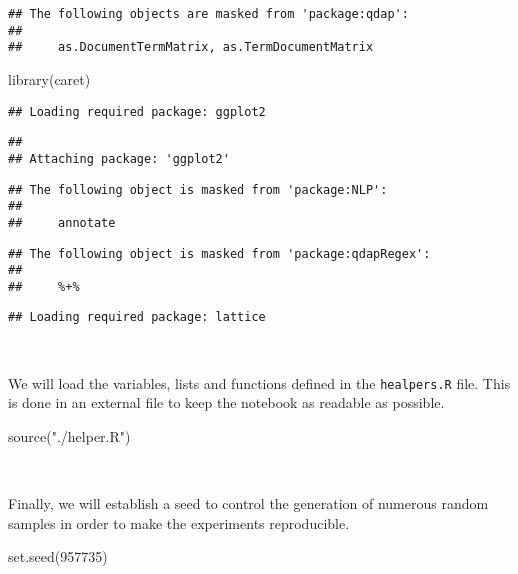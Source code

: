 \documentclass[
]{article}
\newenvironment{Shaded}{\begin{snugshade}}{\end{snugshade}}
\newcommand{\DecValTok}[1]{\textcolor[rgb]{0.00,0.00,0.81}{#1}}
\newcommand{\FunctionTok}[1]{\textcolor[rgb]{0.00,0.00,0.00}{#1}}
\newcommand{\NormalTok}[1]{#1}
\newcommand{\StringTok}[1]{\textcolor[rgb]{0.31,0.60,0.02}{#1}}
\begin{document}
\begin{verbatim}
## The following objects are masked from 'package:qdap':
## 
##     as.DocumentTermMatrix, as.TermDocumentMatrix
\end{verbatim}

\begin{Shaded}
\begin{Highlighting}[]
\FunctionTok{library}\NormalTok{(caret)}
\end{Highlighting}
\end{Shaded}

\begin{verbatim}
## Loading required package: ggplot2
\end{verbatim}

\begin{verbatim}
## 
## Attaching package: 'ggplot2'
\end{verbatim}

\begin{verbatim}
## The following object is masked from 'package:NLP':
## 
##     annotate
\end{verbatim}

\begin{verbatim}
## The following object is masked from 'package:qdapRegex':
## 
##     %+%
\end{verbatim}

\begin{verbatim}
## Loading required package: lattice
\end{verbatim}

~

We will load the variables, lists and functions defined in the
\texttt{healpers.R} file. This is done in an external file to keep the
notebook as readable as possible.

\begin{Shaded}
\begin{Highlighting}[]
\FunctionTok{source}\NormalTok{(}\StringTok{"./helper.R"}\NormalTok{)}
\end{Highlighting}
\end{Shaded}

~

Finally, we will establish a seed to control the generation of numerous
random samples in order to make the experiments reproducible.

\begin{Shaded}
\begin{Highlighting}[]
\FunctionTok{set.seed}\NormalTok{(}\DecValTok{957735}\NormalTok{)}
\end{Highlighting}
\end{Shaded}
\end{document}
